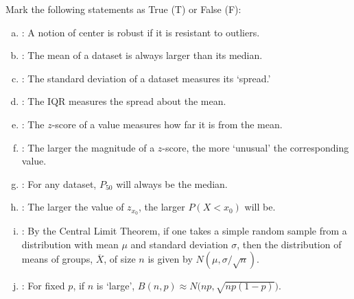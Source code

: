 \documentclass[12pt,letterpaper]{exam}
\begin{document}
\examtitle
{} 
\scores
\newpage

\begin{questions}

\newpage
\question[10] Mark the following statements as True (T) or False (F): \pspace
\begin{enumerate}[(a)]
\item \underline{\hspace{1.5cm}}: A notion of center is robust if it is resistant to outliers. \vfill
\item \underline{\hspace{1.5cm}}: The mean of a dataset is always larger than its median. \vfill
\item \underline{\hspace{1.5cm}}: The standard deviation of a dataset measures its `spread.' \vfill
\item \underline{\hspace{1.5cm}}: The IQR measures the spread about the mean. \vfill
\item \underline{\hspace{1.5cm}}: The $z$-score of a value measures how far it is from the mean. \vfill
\item \underline{\hspace{1.5cm}}: The larger the magnitude of a $z$-score, the more `unusual' the corresponding value. \vfill
\item \underline{\hspace{1.5cm}}: For any dataset, $P_{50}$ will always be the median. \vfill
\item \underline{\hspace{1.5cm}}: The larger the value of $z_{x_0}$, the larger $P(X < x_0)$ will be. \vfill
\item \underline{\hspace{1.5cm}}: By the Central Limit Theorem, if one takes a simple random sample from a distribution with mean $\mu$ and standard deviation $\sigma$, then the distribution of means of groups, $\overline{X}$, of size $n$ is given by $N(\mu, \sigma/\sqrt{n})$. \vfill
\item \underline{\hspace{1.5cm}}: For fixed $p$, if $n$ is `large', $B(n, p) \approx N\big(np, \sqrt{np(1 - p)} \big)$. \vfill
\end{enumerate}




\end{questions}
\end{document}
